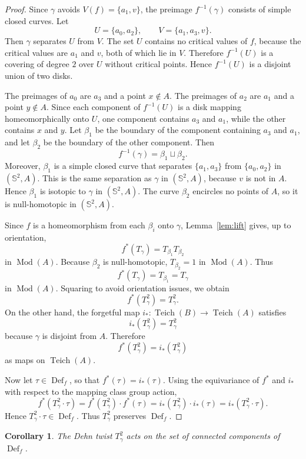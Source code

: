 \documentclass[12pt]{article}
\newtheorem{corollary}[theorem]{Corollary}
\theoremstyle{definition}
\newcommand{\Sph}{\mathbb{S}^2}
\newcommand{\Teich}{\operatorname{Teich}}
\newcommand{\Mod}{\operatorname{Mod}}
\newcommand{\Def}{\operatorname{Def}}
\begin{document}
\begin{proof}
Since \(\gamma\) avoids \(V(f)=\{a_1,v\}\), the preimage \(f^{-1}(\gamma)\) consists of simple closed curves. Let
\[
U=\{a_0,a_2\},\qquad V=\{a_1,a_3,v\}.
\]
Then \(\gamma\) separates \(U\) from \(V\). The set \(U\) contains no critical values of \(f\), because the critical values are \(a_1\) and \(v\), both of which lie in \(V\). Therefore \(f^{-1}(U)\) is a covering of degree \(2\) over \(U\) without critical points. Hence \(f^{-1}(U)\) is a disjoint union of two disks.

The preimages of \(a_0\) are \(a_3\) and a point \(x\notin A\). The preimages of \(a_2\) are \(a_1\) and a point \(y\notin A\). Since each component of \(f^{-1}(U)\) is a disk mapping homeomorphically onto \(U\), one component contains \(a_3\) and \(a_1\), while the other contains \(x\) and \(y\). Let \(\beta_1\) be the boundary of the component containing \(a_3\) and \(a_1\), and let \(\beta_2\) be the boundary of the other component. Then
\[
f^{-1}(\gamma)=\beta_1\sqcup\beta_2.
\]
Moreover, \(\beta_1\) is a simple closed curve that separates \(\{a_1,a_3\}\) from \(\{a_0,a_2\}\) in \((\Sph,A)\). This is the same separation as \(\gamma\) in \((\Sph,A)\), because \(v\) is not in \(A\). Hence \(\beta_1\) is isotopic to \(\gamma\) in \((\Sph,A)\). The curve \(\beta_2\) encircles no points of \(A\), so it is null-homotopic in \((\Sph,A)\).

Since \(f\) is a homeomorphism from each \(\beta_i\) onto \(\gamma\), Lemma~\ref{lem:lift} gives, up to orientation,
\[
f^*(T_\gamma)=T_{\beta_1}T_{\beta_2}
\]
in \(\Mod(A)\). Because \(\beta_2\) is null-homotopic, \(T_{\beta_2}=1\) in \(\Mod(A)\). Thus
\[
f^*(T_\gamma)=T_{\beta_1}=T_\gamma
\]
in \(\Mod(A)\). Squaring to avoid orientation issues, we obtain
\[
f^*(T_\gamma^2)=T_\gamma^2.
\]
On the other hand, the forgetful map \(i_*:\Teich(B)\to\Teich(A)\) satisfies
\[
i_*(T_\gamma^2)=T_\gamma^2
\]
because \(\gamma\) is disjoint from \(A\). Therefore
\[
f^*(T_\gamma^2)=i_*(T_\gamma^2)
\]
as maps on \(\Teich(A)\).

Now let \(\tau\in\Def_f\), so that \(f^*(\tau)=i_*(\tau)\). Using the equivariance of \(f^*\) and \(i_*\) with respect to the mapping class group action,
\[
f^*(T_\gamma^2\cdot \tau)
= f^*(T_\gamma^2)\cdot f^*(\tau)
= i_*(T_\gamma^2)\cdot i_*(\tau)
= i_*(T_\gamma^2\cdot \tau).
\]
Hence \(T_\gamma^2\cdot\tau\in\Def_f\). Thus \(T_\gamma^2\) preserves \(\Def_f\).
\end{proof}

\begin{corollary}
The Dehn twist \(T_\gamma^2\) acts on the set of connected components of \(\Def_f\).
\end{corollary}
\end{document}
